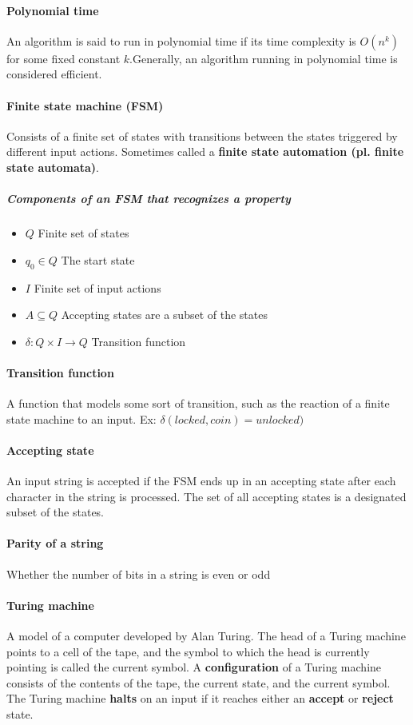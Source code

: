 \documentclass[a4paper]{article}
\begin{document}
\paragraph{Polynomial time} An algorithm is said to run in polynomial time if its time complexity is $O(n^k)$ for some fixed constant $k$.Generally, an algorithm running in polynomial time is considered efficient.
\paragraph{Finite state machine (FSM)} Consists of a finite set of states with transitions between the states triggered by different input actions. Sometimes called a \textbf{finite state automation (pl. finite state automata)}.
\subparagraph{Components of an FSM that recognizes a property}
\begin{itemize}
  \item $Q$ Finite set of states
  \item $q_0 \in Q$ The start state
  \item $I$ Finite set of input actions
  \item $A \subseteq Q$ Accepting states are a subset of the states
  \item $\delta: Q \times I \to Q$ Transition function
\end{itemize}
\paragraph{Transition function} A function that models some sort of transition, such as the reaction of a finite state machine to an input. Ex: $\delta(locked, coin) = unlocked)$
\paragraph{Accepting state} An input string is accepted if the FSM ends up in an accepting state after each character in the string is processed. The set of all accepting states is a designated subset of the states.
\paragraph{Parity of a string} Whether the number of bits in a string is even or odd

\paragraph{Turing machine} A model of a computer developed by Alan Turing. The head of a Turing machine points to a cell of the tape, and the symbol to which the head is currently pointing is called the current symbol. A \textbf{configuration} of a Turing machine consists of the contents of the tape, the current state, and the current symbol. The Turing machine \textbf{halts} on an input if it reaches either an \textbf{accept} or \textbf{reject} state.
\end{document}
